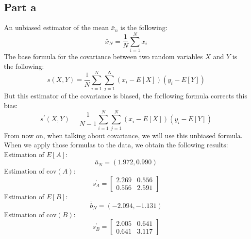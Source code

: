 \documentclass[a4paper, 10pt]{article}
\begin{document}
\subsection{Part a}
An unbiased estimator of the mean $\bar{x}_n$ is the following:
$$
\bar{x}_N = \frac{1}{N} \sum_{i=1}^N x_i
$$
The base formula for the covariance between two random variables $X$ and $Y$ is the following:
$$
s(X,Y) = \frac{1}{N} \sum_{i=1}^N\sum_{j=1}^N(x_i-E[X])(y_i-E[Y])
$$
But this estimator of the covariance is biased, the forllowing formula corrects this bias:
$$
s^\prime(X,Y) = \frac{1}{N-1} \sum_{i=1}^N\sum_{j=1}^N(x_i-E[X])(y_i-E[Y])
$$
From now on, when talking about covariance, we will use this unbiased formula.
\\
When we apply those formulas to the data, we obtain the following results:
\\
Estimation of $E[A]$:
$$
\bar{a}_N = (1.972, 0.990)
$$
Estimation of $\text{cov}(A)$:
$$
s_A^\prime = \begin{bmatrix}
    2.269 & 0.556\\
    0.556 & 2.591
\end{bmatrix}
$$
Estimation of $E[B]$:
$$
\bar{b}_N = (-2.094, -1.131)
$$
Estimation of $\text{cov}(B)$:
$$
s_B^\prime = \begin{bmatrix}
    2.005 & 0.641\\
    0.641 & 3.117
\end{bmatrix}
$$
\end{document}
